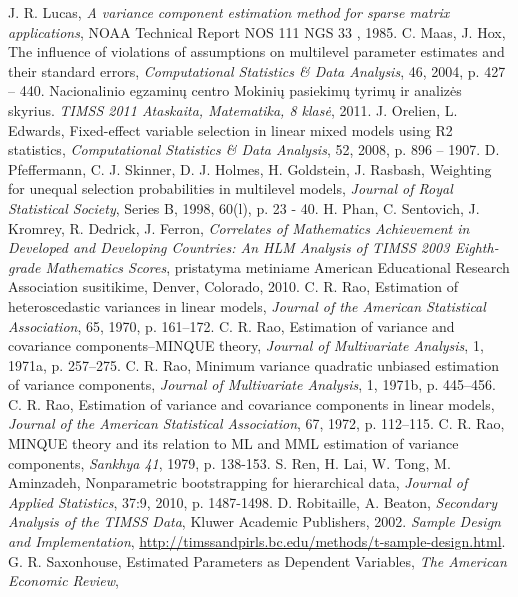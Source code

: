\documentclass[11pt,a4paper]{article}
\begin{document}
\begin{thebibliography}{1}
 J. R. Lucas, \textit{A variance component estimation method for sparse matrix applications}, NOAA Technical Report NOS 111 NGS 33 , 1985.
C. Maas, J. Hox, The influence of violations of assumptions on multilevel parameter estimates and their standard errors, \textit{Computational Statistics \& Data Analysis}, 46, 2004, p. 427 – 440.
 Nacionalinio egzaminų centro Mokinių pasiekimų tyrimų ir analizės skyrius. \textit{TIMSS 2011 Ataskaita, Matematika, 8 klasė}, 2011.
 J. Orelien,  L. Edwards, Fixed-effect variable selection in linear mixed models using R2 statistics, \textit{Computational Statistics \& Data Analysis}, 52, 2008, p. 896 – 1907.
D. Pfeffermann, C. J. Skinner, D. J. Holmes, H. Goldstein, J. Rasbash, Weighting for unequal selection probabilities in multilevel models, \textit{Journal of Royal Statistical Society}, Series B, 1998, 60(l), p. 23 - 40.
 H. Phan, C. Sentovich, J. Kromrey, R. Dedrick, J. Ferron, \textit{Correlates of Mathematics Achievement in Developed and Developing Countries: An HLM Analysis of TIMSS 2003 Eighth-grade Mathematics Scores}, pristatyma metiniame American Educational Research Association susitikime, Denver, Colorado, 2010.
C. R. Rao, Estimation of heteroscedastic variances in linear models, \textit{Journal of the American Statistical Association}, 65, 1970, p. 161–172.
 C. R. Rao, Estimation of variance and covariance components–MINQUE theory, \textit{Journal of Multivariate Analysis}, 1, 1971a, p. 257–275.
 C. R. Rao, Minimum variance quadratic unbiased estimation of variance components, \textit{Journal of Multivariate Analysis}, 1, 1971b, p. 445–456.
C. R. Rao, Estimation of variance and covariance components in linear models, \textit{Journal of the American Statistical Association}, 67, 1972, p. 112–115.
 C. R. Rao, MINQUE theory and its relation to ML and MML estimation of variance components, \textit{Sankhya 41}, 1979, p. 138-153.
 S. Ren, H. Lai, W. Tong, M. Aminzadeh, Nonparametric bootstrapping for hierarchical data, \textit{Journal of Applied Statistics}, 37:9, 2010, p. 1487-1498.
 D. Robitaille, A. Beaton, \textit{Secondary Analysis of the TIMSS Data}, Kluwer Academic Publishers, 2002.
 \textit{Sample Design and Implementation}, \href{http://timssandpirls.bc.edu/methods/t-sample-design.html}{http://timssandpirls.bc.edu/methods/t-sample-design.html}.
 G. R. Saxonhouse, Estimated Parameters as Dependent Variables, \textit{The American Economic Review},

\end{thebibliography}
\end{document}
